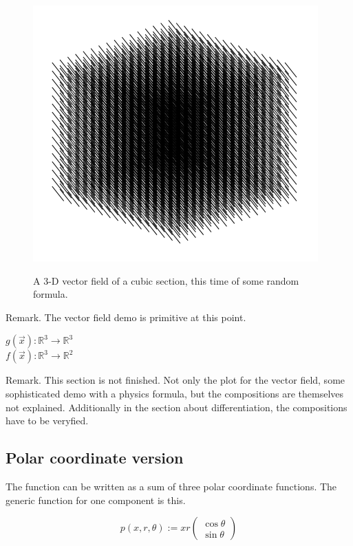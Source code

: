 \documentclass[a4paper]{article}
\begin{document}
\begin{Example}
\begin{figure}
\includegraphics[scale=0.5]{vectorfield.png}
\label{vector_field_image}
\caption{A 3-D vector field of a cubic section, this time of some random formula.}
\end{figure}

Remark. The vector field demo is primitive at this point.

\begin{center}
$g(\vec{x}) : \mathbb{R}^{3} \rightarrow \mathbb{R}^{3}$\\
$f(\vec{x}) : \mathbb{R}^{3} \rightarrow \mathbb{R}^{2}$\\
\end{center}


Remark. This section is not finished. Not only the plot for the vector field, some sophisticated demo with a physics formula, but the compositions are themselves not explained. Additionally in the section about differentiation, the compositions have to be veryfied.\\


\subsection{Polar coordinate version}
\label{polar_coord_func}

The function can be written as a sum of three polar coordinate functions. The generic function for one component is this.

\begin{displaymath}
p(x, r, \theta) := xr\begin{pmatrix}\cos\theta\\\sin\theta\end{pmatrix}
\end{displaymath}


\end{Example}
\end{document}

